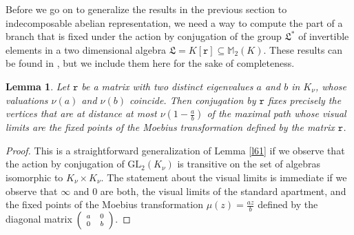 \documentclass{article}
\newtheorem{Lem}[Prop]{Lemma}
\theoremstyle{definition}
\theoremstyle{remark}
\newcommand\sbmattrix[4]{\textnormal{\scriptsize$\left(\begin{array}{cc}#1&#2\\#3&#4\end{array}\right)$\normalsize}}
\begin{document}
Before we go on to generalize the results in the previous
section to indecomposable abelian representation,
we need a way to compute
the part of a branch that is fixed under 
the action by conjugation
of the group $\mathfrak{L}^*$ of invertible elements in a two 
dimensional algebra $\mathfrak{L}=K[\mathtt{r}]\subseteq
\mathbb{M}_2(K)$. These results can be found in \cite{AB19},
but we include them here for the sake of completeness.

\begin{Lem}\label{l61b}
     Let $\mathtt{r}$ be a matrix with two 
     distinct eigenvalues $a$ and $b$ in $K_\nu$,
     whose valuations $\nu(a)$ and $\nu(b)$ coincide. 
    Then conjugation by $\mathtt{r}$
    fixes precisely the vertices that are at distance at most 
    $\nu\left(1-\frac ab\right)$ of the maximal path whose 
    visual limits are the fixed points of the Moebius 
    transformation defined by the matrix $\mathtt{r}$.
\end{Lem}

\begin{proof}
    This is a straightforward 
generalization of Lemma \ref{l61} if we observe that
the action by conjugation of $\mathrm{GL}_2(K_\nu)$ 
is transitive on the set of
algebras isomorphic to $K_\nu\times K_\nu$.
The statement about the visual limits is immediate if
we observe that $\infty$ and $0$ are both, the visual
limits of the standard apartment, and the fixed points
of the Moebius transformation $\mu(z)=\frac{az}{b}$
defined by the diagonal matrix $\sbmattrix{a}{0}{0}{b}$.
\end{proof}
\end{document}
